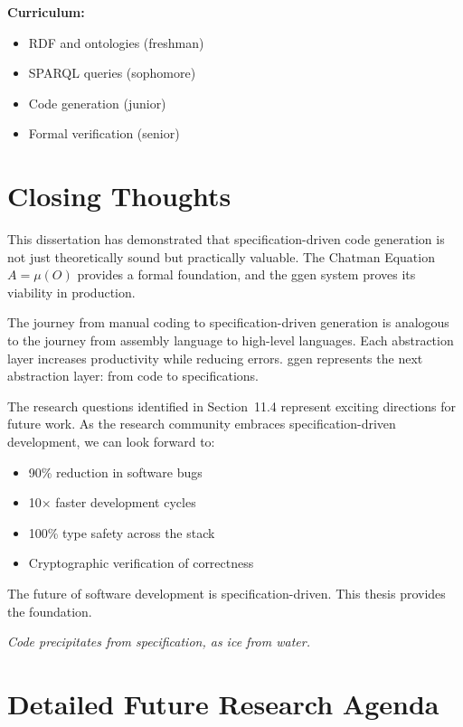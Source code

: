 \textbf{Curriculum:}
\begin{itemize}
    \item RDF and ontologies (freshman)
    \item SPARQL queries (sophomore)
    \item Code generation (junior)
    \item Formal verification (senior)
\end{itemize}

\section{Closing Thoughts}

This dissertation has demonstrated that specification-driven code generation is not just theoretically sound but practically valuable. The Chatman Equation \(A = \mu(O)\) provides a formal foundation, and the ggen system proves its viability in production.

The journey from manual coding to specification-driven generation is analogous to the journey from assembly language to high-level languages. Each abstraction layer increases productivity while reducing errors. ggen represents the next abstraction layer: from code to specifications.

The research questions identified in Section~11.4 represent exciting directions for future work. As the research community embraces specification-driven development, we can look forward to:
\begin{itemize}
    \item 90\% reduction in software bugs
    \item 10× faster development cycles
    \item 100\% type safety across the stack
    \item Cryptographic verification of correctness
\end{itemize}

The future of software development is specification-driven. This thesis provides the foundation.

\begin{center}
    \textit{Code precipitates from specification, as ice from water.}
\end{center}

\section{Detailed Future Research Agenda}

